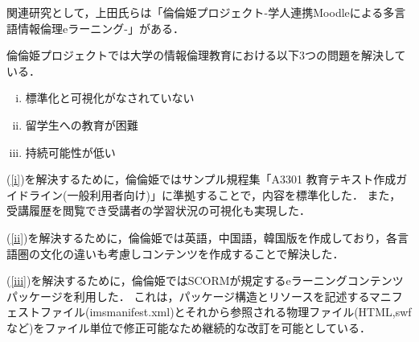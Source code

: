 関連研究として，上田氏らは「倫倫姫プロジェクト-学人連携Moodleによる多言語情報倫理eラーニング-」\cite{rinri}がある．

倫倫姫プロジェクトでは大学の情報倫理教育における以下3つの問題を解決している．

\begin{enumerate}[(i)]
    \item 標準化と可視化がなされていない \label{i}
    \item 留学生への教育が困難 \label{ii}
    \item 持続可能性が低い \label{iii}
\end{enumerate}

(\ref{i})を解決するために，倫倫姫ではサンプル規程集「A3301 教育テキスト作成ガイドライン(一般利用者向け)」に準拠することで，内容を標準化した．
また，受講履歴を閲覧でき受講者の学習状況の可視化も実現した．

(\ref{ii})を解決するために，倫倫姫では英語，中国語，韓国版を作成しており，各言語圏の文化の違いも考慮しコンテンツを作成することで解決した．

(\ref{iii})を解決するために，倫倫姫ではSCORMが規定するeラーニングコンテンツパッケージを利用した．
これは，パッケージ構造とリソースを記述するマニフェストファイル(imsmanifest.xml)とそれから参照される物理ファイル(HTML,swfなど)をファイル単位で修正可能なため継続的な改訂を可能としている．
